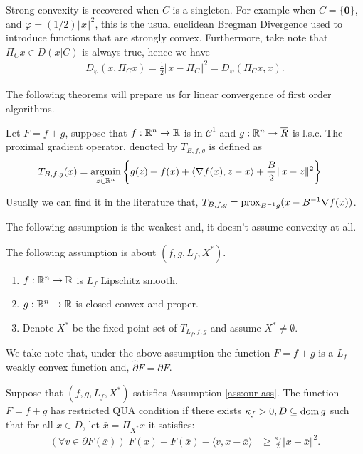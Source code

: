 \documentclass[12pt]{article}
\begin{document}
    Strong convexity is recovered when $C$ is a singleton. 
    For example when $C = \{\mathbf 0\}$, and $\varphi = (1/2)\Vert x\Vert^2$, this is the usual euclidean Bregman Divergence used to introduce functions that are strongly convex. 
    Furthermore, take note that $\Pi_C x \in D(x | C)$ is always true, hence we have
    \begin{align}
        D_\varphi(x, \Pi_C x) = \frac{1}{2}\Vert x - \Pi_C \Vert^2 = D_\varphi(\Pi_C x, x). 
    \end{align}
    \par
    The following theorems will prepare us for linear convergence of first order algorithms. 
    \begin{definition}\label{def:pg}
        Let $F = f + g$, suppose that $f : \mathbb R^n \rightarrow \mathbb R$ is in $\mathcal C^1$ and $g: \mathbb R^n \rightarrow \overline R$ is l.s.c. 
        The proximal gradient operator, denoted by $T_{B, f, g}$ is defined as
        \begin{align*}
            T_{B, f, g}(x) &= \mathop{\rm argmin}\limits_{z\in \mathbb R^n} \left\lbrace
                g(z) + f(x) + \langle \nabla f(x), z - x\rangle + \frac{B}{2}\Vert x - z\Vert^2
            \right\rbrace
        \end{align*}
    \end{definition}
    \begin{remark}
        Usually we can find it in the literature that, $T_{B, f, g} = \operatorname{prox}_{B^{-1}g}(x - B^{-1}\nabla f(x))$. 
    \end{remark}
    The following assumption is the weakest and, it doesn't assume convexity at all. 
    \begin{assumption}\label{ass:our-ass}
        The following assumption is about $(f, g, L_f, X^*)$. 
        \begin{enumerate}
            \item $f: \mathbb R^n \rightarrow \mathbb R$ is $L_f$ Lipschitz smooth. 
            \item $g: \mathbb R^n \rightarrow \mathbb R$ is closed convex and proper. 
            \item Denote $X^*$ be the fixed point set of $T_{L_f, f, g}$ and assume $X^* \neq \emptyset$. 
        \end{enumerate}
    \end{assumption}
    We take note that, under the above assumption the function $F = f + g$ is a $L_f$ weakly convex function and, $\widehat \partial F = \partial F$. 
    \begin{definition}
        Suppose that $(f, g, L_f, X^*)$ satisfies Assumption \ref{ass:our-ass}. 
        The function $F = f + g$ has restricted QUA condition if there exists $\kappa_f > 0, D \subseteq \operatorname{dom} g$ such that for all $x \in D$, let $\bar x = \Pi_{X^*}x$ it satisfies: 
        \begin{align*}
            \left(\forall v \in \partial F(\bar x)\right)\;
            F(x) - F(\bar x) - \langle v, x - \bar x\rangle 
            &\ge \frac{\kappa_f}{2}\Vert x - \bar x\Vert^2. 
        \end{align*}
    \end{definition}
\end{document}
